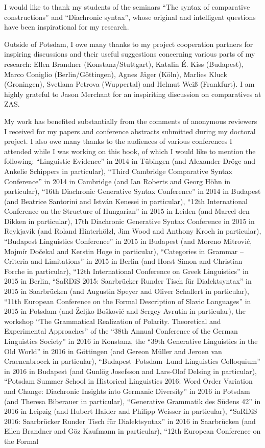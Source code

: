 \begin{refsection}
I would like to thank my students of the seminars ``The syntax of comparative constructions'' and ``Diachronic syntax'', whose original and intelligent questions have been inspirational for my research.

Outside of Potsdam, I owe many thanks to my project cooperation partners for inspiring discussions and their useful suggestions concerning various parts of my research: Ellen Brandner (Konstanz/Stuttgart), 
Katalin É. Kiss (Budapest),
Marco Coniglio (Berlin/Göt\-tin\-gen), 
Agnes Jäger (Köln), Marlies Kluck (Groningen), Svetlana Petrova (Wuppertal) and Helmut Weiß (Frankfurt). I am highly grateful to Jason Merchant for an inspiriting discussion on comparatives at ZAS.

My work has benefited substantially from the comments of anonymous reviewers I received for my papers and conference abstracts submitted during my doctoral project. I also owe many thanks to the audiences of various conferences I attended while I was working on this book, of which I would like to mention the following: ``Linguistic Evidence'' in 2014 in Tübingen (and Alexander Dröge and Ankelie Schippers in particular), ``Third Cambridge Comparative Syntax Conference'' in 2014 in Cambridge (and Ian Roberts and Georg Höhn in particular), ``16th Diachronic Generative Syntax Conference'' in 2014 in Budapest (and Bea\-trice Santorini and Istv\'an Kenesei in particular), ``12th International Conference on the Structure of Hungarian'' in 2015 in Leiden (and Marcel den Dikken in particular), 17th Diachronic Generative Syntax Conference in 2015 in Reykjavík (and Roland Hinterhölzl, Jim Wood and Anthony Kroch in particular), ``Budapest Linguistics Conference'' in 2015 in Budapest (and Moreno Mitrovi\'c, Mojm\'ir Do\v{c}ekal and Kerstin Hoge in particular), ``Categories in Grammar -- Criteria and Limitations'' in 2015 in Berlin (and Horst Simon and Christian Forche in particular), ``12th International Conference on Greek Linguistics'' in 2015 in Berlin, ``SaRDiS 2015: Saarbrücker Runder Tisch für Dialektsyntax'' in 2015 in Saarbrücken (and Augustin Speyer and Oliver Schallert in particular), ``11th European Conference on the Formal Description of Slavic Languages'' in 2015 in Potsdam (and \v{Z}eljko Bo\v{s}kovi\'c and Sergey Avrutin in particular), the workshop ``The Grammatical Realization of Polarity. Theoretical and Experimental Approaches'' of the ``38th Annual Conference of the German Linguistics Society'' in 2016 in Konstanz, the ``39th Generative Linguistics in the Old World'' in 2016 in Göttingen (and Gereon Müller and Jeroen van Craenenbroeck in particular), ``Budapest--Potsdam--Lund Linguistics Colloquium'' in 2016 in Budapest (and Gunlög Josefsson and Lars-Olof Delsing in particular), ``Potsdam Summer School in Historical Linguistics 2016: Word Order Variation and Change: Diachronic Insights into Germanic Diversity'' in 2016 in Potsdam (and Theresa Biberauer in particular), ``Generative Grammatik des Südens 42'' in 2016 in Leipzig (and Hubert Haider and Philipp Weisser in particular), ``SaRDiS 2016: Saarbrücker Runder Tisch für Dialektsyntax'' in 2016 in Saarbrücken (and Ellen Brandner and Göz Kaufmann in particular), ``12th European Conference on the Formal 
\end{refsection}
